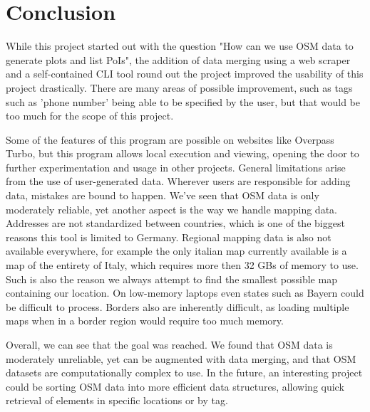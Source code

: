 \documentclass[runningheads]{llncs}
\begin{document}
\section{Conclusion}
While this project started out with the question "How can we use OSM data to generate plots and list PoIs", the addition of data merging using a web scraper and a self-contained CLI tool round out the project improved the usability of this project drastically. There are many areas of possible improvement, such as tags such as 'phone number' being able to be specified by the user, but that would be too much for the scope of this project. 

Some of the features of this program are possible on websites like Overpass Turbo, but this program allows local execution and viewing, opening the door to further experimentation and usage in other projects.
General limitations arise from the use of user-generated data. Wherever users are responsible for adding data, mistakes are bound to happen. We've seen that OSM data is only moderately reliable, yet another aspect is the way we handle mapping data. Addresses are not standardized between countries, which is one of the biggest reasons this tool is limited to Germany. Regional mapping data is also not available everywhere, for example the only italian map currently available is a map of the entirety of Italy, which requires more then 32 GBs of memory to use. Such is also the reason we always attempt to find the smallest possible map containing our location. On low-memory laptops even states such as Bayern could be difficult to process. Borders also are inherently difficult, as loading multiple maps when in a border region would require too much memory.

Overall, we can see that the goal was reached. We found that OSM data is moderately unreliable, yet can be augmented with data merging, and that OSM datasets are computationally complex to use. In the future, an interesting project could be sorting OSM data into more efficient data structures, allowing quick retrieval of elements in specific locations or by tag.

        
\end{document}
